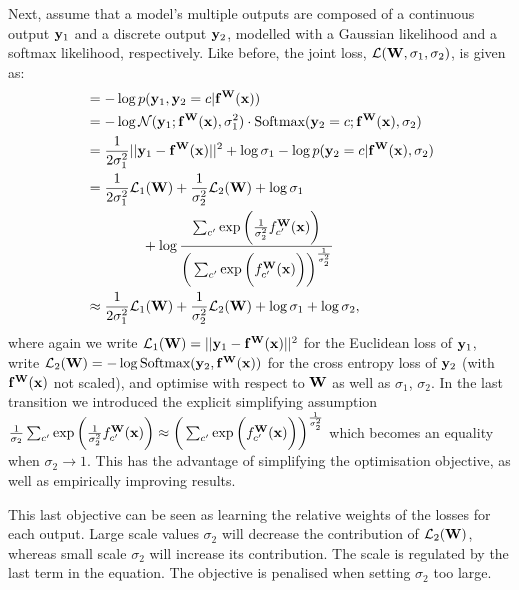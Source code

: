 Next, assume that a model's multiple outputs are composed of a continuous output $\mathbf{y}_1$ and a discrete output $\mathbf{y}_2$, modelled with a Gaussian likelihood and a softmax likelihood, respectively. Like before, the joint loss, $\mathcal{L}(\mathbf{W}, \sigma_1, \sigma_2)$, is given as:
\begin{equation}
\begin{aligned}
 &= 
-\log p(\mathbf{y}_1, \mathbf{y}_2=c | \mathbf{f}^{\mathbf{W}}(\mathbf{x})) \\
&= 
-\log \mathcal{N}(\mathbf{y}_1; \mathbf{f}^{\mathbf{W}}(\mathbf{x}), \sigma_1^2) \cdot
\text{Softmax}(\mathbf{y}_2=c; \mathbf{f}^{\mathbf{W}}(\mathbf{x}), \sigma_2) \\
&=
\frac{1}{2 \sigma_1^2} ||\mathbf{y}_1 - \mathbf{f}^{\mathbf{W}}(\mathbf{x})||^2
+ \log \sigma_1
- \log p(\mathbf{y}_2 = c | \mathbf{f}^{\mathbf{W}}(\mathbf{x}), \sigma_2)
 \\
&= \frac{1}{2 \sigma_1^2} \mathcal{L}_1(\mathbf{W}) 
+ \frac{1}{\sigma_2^2} \mathcal{L}_2(\mathbf{W})
+ \log \sigma_1 \\
&\quad\quad\quad\quad + \log \frac{
\sum_{c'} \exp \bigg( \frac{1}{\sigma_2^2} f^{\mathbf{W}}_{c'}(\mathbf{x}) \bigg)
}{
\bigg( \sum_{c'} \exp \bigg( f^{\mathbf{W}}_{c'}(\mathbf{x}) \bigg) \bigg)^{\frac{1}{\sigma_2^2} }
}
\\
&\approx \frac{1}{2 \sigma_1^2} \mathcal{L}_1(\mathbf{W}) 
+ \frac{1}{\sigma_2^2} \mathcal{L}_2(\mathbf{W})
+ \log \sigma_1
+ \log \sigma_2,
\end{aligned}
\end{equation}
where again we write $\mathcal{L}_1(\mathbf{W}) = ||\mathbf{y}_1 - \mathbf{f}^{\mathbf{W}}(\mathbf{x})||^2$ for the Euclidean loss of $\mathbf{y}_1$, write $\mathcal{L}_2(\mathbf{W}) = -\log \text{Softmax} (\mathbf{y}_2, \mathbf{f}^{\mathbf{W}}(\mathbf{x}))$ for the cross entropy loss of $\mathbf{y}_2$ (with $\mathbf{f}^{\mathbf{W}}(\mathbf{x})$ not scaled), and optimise with respect to $\mathbf{W}$ as well as $\sigma_1$, $\sigma_2$.
In the last transition we introduced the explicit simplifying assumption $\frac{1}{\sigma_2} \sum_{c'} \exp \bigg( \frac{1}{\sigma_2^2} f^{\mathbf{W}}_{c'}(\mathbf{x}) \bigg) \approx \bigg( \sum_{c'} \exp \bigg( f^{\mathbf{W}}_{c'}(\mathbf{x}) \bigg) \bigg)^{\frac{1}{\sigma_2^2} }$ which becomes an equality when $\sigma_2 \rightarrow 1$. This has the advantage of simplifying the optimisation objective, as well as empirically improving results.

This last objective can be seen as learning the relative weights of the losses for each output. Large scale values $\sigma_2$ will decrease the contribution of $\mathcal{L}_2(\mathbf{W})$, whereas small scale $\sigma_2$ will increase its contribution. The scale is regulated by the last term in the equation. The objective is penalised when setting $\sigma_2$ too large. %


